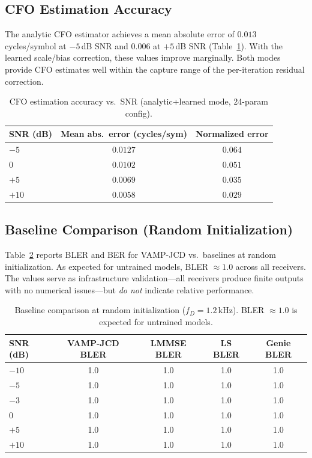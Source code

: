 \documentclass{article}
\begin{document}
\subsection{CFO Estimation Accuracy}

The analytic CFO estimator achieves a mean absolute error of $0.013$ cycles/symbol at $-5$\,dB SNR and $0.006$ at $+5$\,dB SNR (Table~\ref{tab:cfo}). With the learned scale/bias correction, these values improve marginally. Both modes provide CFO estimates well within the capture range of the per-iteration residual correction.

\begin{table}[h]
  \centering
  \caption{CFO estimation accuracy vs.\ SNR (analytic+learned mode, 24-param config).}
  \label{tab:cfo}
  \begin{tabular}{@{}lcc@{}}
    \toprule
    SNR (dB) & Mean abs.\ error (cycles/sym) & Normalized error \\
    \midrule
    $-5$ & $0.0127$ & $0.064$ \\
    $0$  & $0.0102$ & $0.051$ \\
    $+5$ & $0.0069$ & $0.035$ \\
    $+10$ & $0.0058$ & $0.029$ \\
    \bottomrule
  \end{tabular}
\end{table}

\subsection{Baseline Comparison (Random Initialization)}

Table~\ref{tab:baseline} reports BLER and BER for VAMP-JCD vs.\ baselines at random initialization. As expected for untrained models, BLER $\approx 1.0$ across all receivers. The values serve as infrastructure validation---all receivers produce finite outputs with no numerical issues---but \emph{do not} indicate relative performance.

\begin{table}[h]
  \centering
  \caption{Baseline comparison at random initialization ($f_D = 1.2$\,kHz). BLER $\approx 1.0$ is expected for untrained models.}
  \label{tab:baseline}
  \begin{tabular}{@{}lcccc@{}}
    \toprule
    SNR (dB) & VAMP-JCD BLER & LMMSE BLER & LS BLER & Genie BLER \\
    \midrule
    $-10$ & 1.0 & 1.0 & 1.0 & 1.0 \\
    $-5$  & 1.0 & 1.0 & 1.0 & 1.0 \\
    $-3$  & 1.0 & 1.0 & 1.0 & 1.0 \\
    $0$   & 1.0 & 1.0 & 1.0 & 1.0 \\
    $+5$  & 1.0 & 1.0 & 1.0 & 1.0 \\
    $+10$ & 1.0 & 1.0 & 1.0 & 1.0 \\
    \bottomrule
  \end{tabular}
\end{table}
\end{document}
